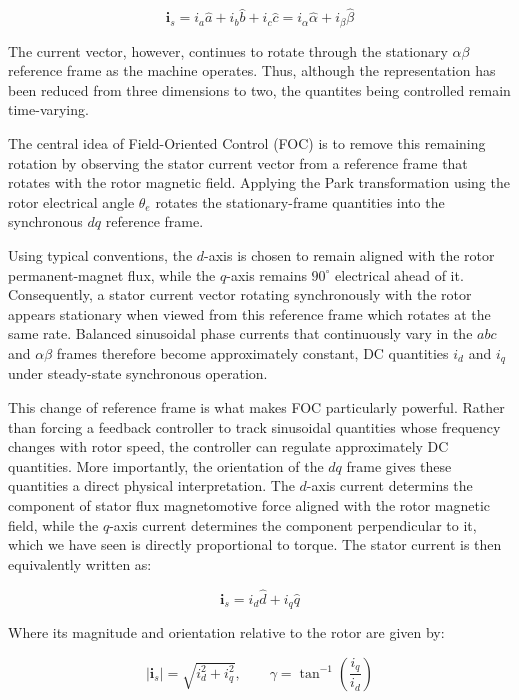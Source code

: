 \documentclass{article}
\begin{document}
\begin{equation}
    \mathbf{i}_s = i_a\hat{a} + i_b\hat{b} + i_c\hat{c} = i_\alpha\hat{\alpha} + i_\beta\hat{\beta}
\end{equation}

The current vector, however, continues to rotate through the stationary $\alpha\beta$ reference frame as the machine operates. Thus, although the representation has been reduced from three dimensions to two, the quantites being controlled remain time-varying.

The central idea of Field-Oriented Control (FOC) is to remove this remaining rotation by observing the stator current vector from a reference frame that rotates with the rotor magnetic field. Applying the Park transformation using the rotor electrical angle $\theta_e$ rotates the stationary-frame quantities into the synchronous $dq$ reference frame.

Using typical conventions, the $d$-axis is chosen to remain aligned with the rotor permanent-magnet flux, while the $q$-axis remains $90^\circ$ electrical ahead of it. Consequently, a stator current vector rotating synchronously with the rotor appears stationary when viewed from this reference frame which rotates at the same rate. Balanced sinusoidal phase currents that continuously vary in the $abc$ and $\alpha\beta$ frames therefore become approximately constant, DC quantities $i_d$ and $i_q$ under steady-state synchronous operation. 

This change of reference frame is what makes FOC particularly powerful. Rather than forcing a feedback controller to track sinusoidal quantities whose frequency changes with rotor speed, the controller can regulate approximately DC quantities. More importantly, the orientation of the $dq$ frame gives these quantities a direct physical interpretation. The $d$-axis current determins the component of stator flux magnetomotive force aligned with the rotor magnetic field, while the $q$-axis current determines the component perpendicular to it, which we have seen is directly proportional to torque. The stator current is then equivalently written as:

\begin{equation}
    \mathbf{i}_s = i_d\hat{d} + i_q\hat{q}
\end{equation}

Where its magnitude and orientation relative to the rotor are given by:

\begin{equation}
    |\mathbf{i}_s| = \sqrt{i_d^2 + i_q^2}, \qquad
    \gamma = \tan^{-1}\left(\frac{i_q}{i_d}\right)
\end{equation}
\end{document}
